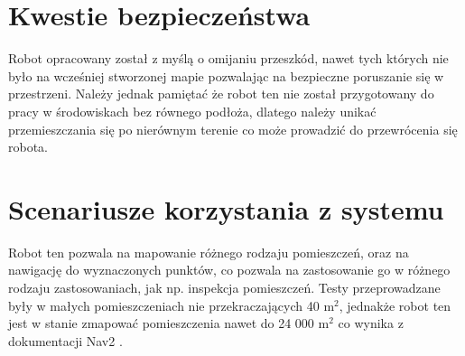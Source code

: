 \documentclass[a4paper,twoside,12pt]{book}
\begin{document}
\section{Kwestie bezpieczeństwa}
Robot opracowany został z myślą o omijaniu przeszkód, nawet tych których nie było na wcześniej stworzonej mapie pozwalając na bezpieczne poruszanie się w przestrzeni.
Należy jednak pamiętać że robot ten nie został przygotowany do pracy w środowiskach bez równego podłoża, dlatego należy unikać przemieszczania się po nierównym terenie co może prowadzić do przewrócenia się robota.
\newpage
\section{Scenariusze korzystania z systemu}

Robot ten pozwala na mapowanie różnego rodzaju pomieszczeń, oraz na nawigację do wyznaczonych punktów, co pozwala na zastosowanie go w różnego rodzaju zastosowaniach, jak np. inspekcja pomieszczeń. Testy przeprowadzane były w małych pomieszczeniach nie przekraczających 40 m$^2$, jednakże robot ten jest w stanie zmapować pomieszczenia nawet do 24 000 m$^2$ co wynika z dokumentacji Nav2 \cite{bib:abs-2003-00368}.
%
%
%
%
%        
\end{document}
